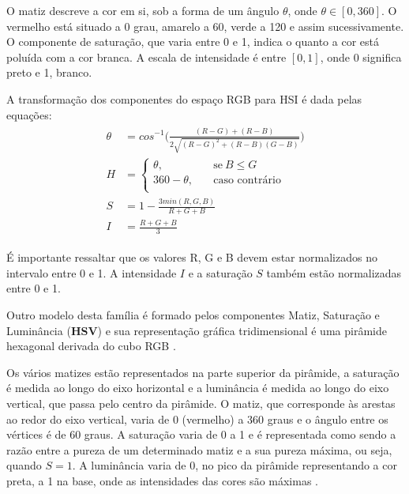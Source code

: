 O matiz descreve a cor em si, sob a forma de um ângulo $\theta$, onde $\theta \in [0, 360]$. O vermelho está situado a 0 grau, amarelo a 60, verde a 120 e assim sucessivamente. O componente de saturação, que varia entre 0 e 1, indica o quanto a cor está poluída com a cor branca. A escala de intensidade é entre $[0, 1]$, onde 0 significa preto e 1, branco.

A transformação dos componentes do espaço RGB para HSI é dada pelas equações:
\begin{align}
\label{eq:rgb_para_hsi}
\begin{split}
  \theta &= cos^{-1} \bigg( \frac{(R - G) + (R - B)}{2 \sqrt{(R - G)^2 + (R - B)(G - B)}} \bigg)
  \\
  H &= \begin{cases}
            \theta, \quad &\text{se}\ B \leq G\\
            360 - \theta, \quad &\text{caso contrário}\\
       \end{cases}
  \\
  S &= 1 - \frac{3 min(R, G, B)}{R + G + B}
  \\
  I &= \frac{R + G + B}{3}
\end{split}
\end{align}

É importante ressaltar que os valores R, G e B devem estar normalizados no intervalo entre 0 e 1. A intensidade $I$ e a saturação $S$ também estão normalizadas entre 0 e 1.

Outro modelo desta família é formado pelos componentes Matiz, Saturação e Luminância (\textbf{HSV}) e sua representação gráfica tridimensional é uma pirâmide hexagonal derivada do cubo RGB \citep{pedrini:08}.

Os vários matizes estão representados na parte superior da pirâmide, a saturação é medida ao longo do eixo horizontal e a luminância é medida ao longo do eixo vertical, que passa pelo centro da pirâmide. O matiz, que corresponde às arestas ao redor do eixo vertical, varia de 0 (vermelho) a 360 graus e o ângulo entre os vértices é de 60 graus. A saturação varia de 0 a 1 e é representada como sendo a razão entre a pureza de um determinado matiz e a sua pureza máxima, ou seja, quando $S = 1$. A luminância varia de 0, no pico da pirâmide representando a cor preta, a 1 na base, onde as intensidades das cores são máximas \citep{pedrini:08}.

